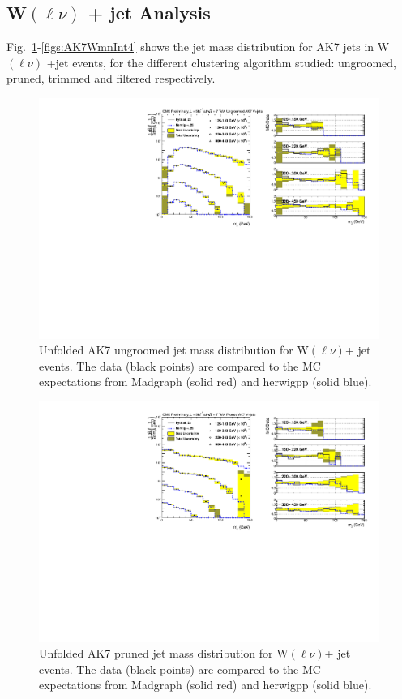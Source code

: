 \clearpage


\subsection{W$(\ell\nu)$ + jet Analysis}

Fig.~\ref{figs:AK7WmnInt1}-\ref{figs:AK7WmnInt4} shows the jet mass distribution for AK7 jets in W$(\ell\nu)$ +jet events, for the different clustering algorithm studied: ungroomed, pruned, trimmed and filtered respectively.

\begin{figure}[!htb]
\includegraphics[width=0.99\textwidth]{figs/Wln/jetmassunf_ak7_log.pdf}
\caption{Unfolded AK7 ungroomed jet mass distribution for W$(\ell\nu)$+ jet events. The data (black points) are compared to the MC expectations from Madgraph (solid red) and herwigpp (solid blue).}
\label{figs:AK7WmnInt1}
\end{figure}

\begin{figure}[!htb]
\includegraphics[width=0.99\textwidth]{figs/Wln/jetmassunf_ak7pr_log.pdf}
\caption{Unfolded AK7 pruned jet mass distribution for W$(\ell\nu)$+ jet events. The data (black points) are compared to the MC expectations from Madgraph (solid red) and herwigpp (solid blue).}
\label{figs:AK7WmnInt2}
\end{figure}

